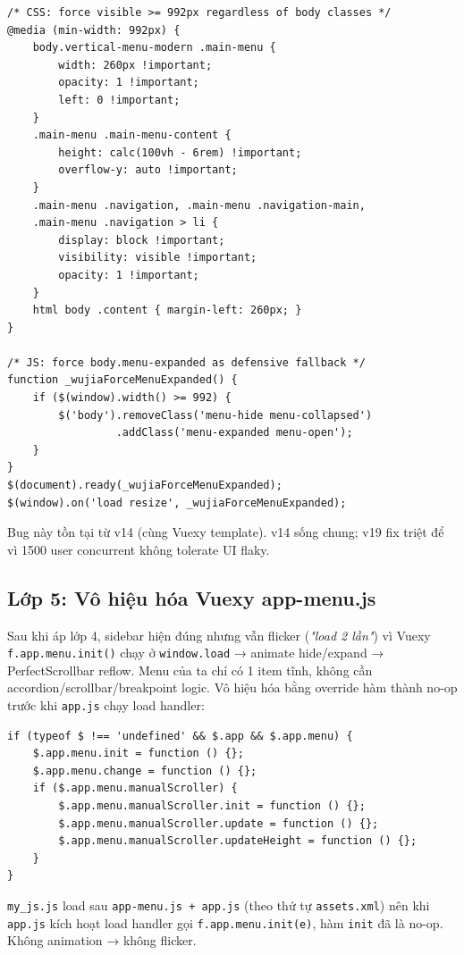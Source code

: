 \begin{lstlisting}[style=python]
/* CSS: force visible >= 992px regardless of body classes */
@media (min-width: 992px) {
    body.vertical-menu-modern .main-menu {
        width: 260px !important;
        opacity: 1 !important;
        left: 0 !important;
    }
    .main-menu .main-menu-content {
        height: calc(100vh - 6rem) !important;
        overflow-y: auto !important;
    }
    .main-menu .navigation, .main-menu .navigation-main,
    .main-menu .navigation > li {
        display: block !important;
        visibility: visible !important;
        opacity: 1 !important;
    }
    html body .content { margin-left: 260px; }
}

/* JS: force body.menu-expanded as defensive fallback */
function _wujiaForceMenuExpanded() {
    if ($(window).width() >= 992) {
        $('body').removeClass('menu-hide menu-collapsed')
                 .addClass('menu-expanded menu-open');
    }
}
$(document).ready(_wujiaForceMenuExpanded);
$(window).on('load resize', _wujiaForceMenuExpanded);
\end{lstlisting}

Bug này tồn tại từ v14 (cùng Vuexy template). v14 sống chung; v19 fix triệt để vì 1500 user concurrent không tolerate UI flaky.

\subsection{Lớp 5: Vô hiệu hóa Vuexy app-menu.js}

Sau khi áp lớp 4, sidebar hiện đúng nhưng vẫn flicker (\emph{"load 2 lần"}) vì Vuexy \texttt{f.app.menu.init()} chạy ở \texttt{window.load} → animate hide/expand → PerfectScrollbar reflow. Menu của ta chỉ có 1 item tĩnh, không cần accordion/scrollbar/breakpoint logic. Vô hiệu hóa bằng override hàm thành no-op trước khi \texttt{app.js} chạy load handler:

\begin{lstlisting}[style=python]
if (typeof $ !== 'undefined' && $.app && $.app.menu) {
    $.app.menu.init = function () {};
    $.app.menu.change = function () {};
    if ($.app.menu.manualScroller) {
        $.app.menu.manualScroller.init = function () {};
        $.app.menu.manualScroller.update = function () {};
        $.app.menu.manualScroller.updateHeight = function () {};
    }
}
\end{lstlisting}

\texttt{my\_js.js} load sau \texttt{app-menu.js + app.js} (theo thứ tự \texttt{assets.xml}) nên khi \texttt{app.js} kích hoạt load handler gọi \texttt{f.app.menu.init(e)}, hàm \texttt{init} đã là no-op. Không animation → không flicker.

